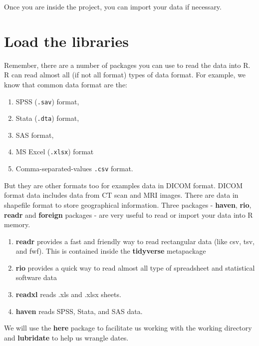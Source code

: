 \documentclass[
  10pt,
]{krantz}
\providecommand{\tightlist}{%
  \setlength{\itemsep}{0pt}\setlength{\parskip}{0pt}}
\begin{document}
Once you are inside the project, you can import your data if necessary.

\hypertarget{load-the-libraries}{%
\section{Load the libraries}\label{load-the-libraries}}

Remember, there are a number of packages you can use to read the data into R. R can read almost all (if not all format) types of data format. For example, we know that common data format are the:

\begin{enumerate}
\def\labelenumi{\arabic{enumi}.}
\tightlist
\item
  SPSS (\texttt{.sav}) format,
\item
  Stata (\texttt{.dta}) format,
\item
  SAS format,
\item
  MS Excel (\texttt{.xlsx}) format
\item
  Comma-separated-values \texttt{.csv} format.
\end{enumerate}

But they are other formats too for examples data in DICOM format. DICOM format data includes data from CT scan and MRI images. There are data in shapefile format to store geographical information. Three packages - \textbf{haven}, \textbf{rio}, \textbf{readr} and \textbf{foreign} packages - are very useful to read or import your data into R memory.

\begin{enumerate}
\def\labelenumi{\arabic{enumi}.}
\tightlist
\item
  \textbf{readr} provides a fast and friendly way to read rectangular data (like csv, tsv, and fwf). This is contained inside the \textbf{tidyverse} metapackage
\item
  \textbf{rio} provides a quick way to read almost all type of spreadsheet and statistical software data
\item
  \textbf{readxl} reads .xls and .xlsx sheets.
\item
  \textbf{haven} reads SPSS, Stata, and SAS data.
\end{enumerate}

We will use the \textbf{here} package to facilitate us working with the working directory and \textbf{lubridate} to help us wrangle dates.
\end{document}
